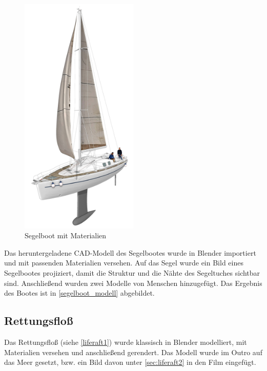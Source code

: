 \begin{figure}[H]
\begin{center}
\includegraphics[width=0.5\textwidth]{gfx/prod/boat/boat.jpg}
\end{center}
\caption{Segelboot mit Materialien}
\label{segelboot_modell}
\end{figure}

Das heruntergeladene CAD-Modell  des Segelbootes wurde in Blender importiert und mit passenden Materialien versehen. Auf das Segel wurde ein Bild  eines Segelbootes projiziert, damit die Struktur und die Nähte des Segeltuches sichtbar sind. Anschließend wurden zwei Modelle von Menschen  hinzugefügt. Das Ergebnis des Bootes ist in \autoref{segelboot_modell} abgebildet.

\subsection{Rettungsfloß}

\label{sec:liferaft1}

Das Rettungsfloß (siehe \autoref{liferaft1}) wurde klassisch in Blender modelliert, mit Materialien versehen und anschließend gerendert. Das Modell wurde im Outro auf das Meer gesetzt, bzw. ein Bild davon unter \autoref{sec:liferaft2} in den Film eingefügt.

